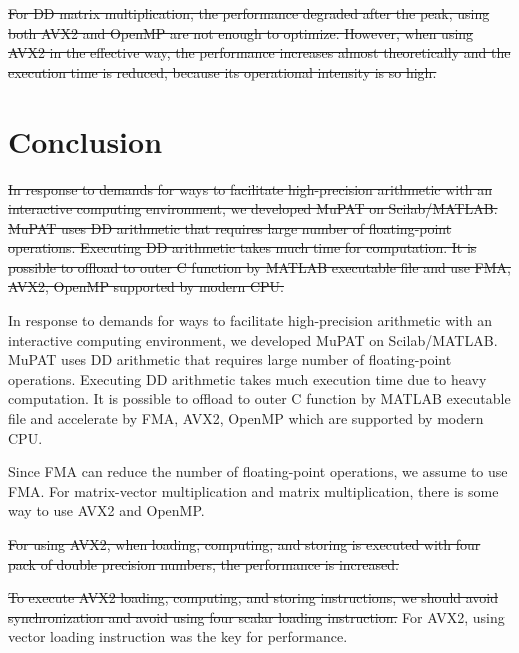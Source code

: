 \documentclass{IOS-Book-Article}
\begin{document}
\sout{For DD matrix multiplication, the performance degraded after the peak, using both AVX2 and OpenMP are not enough to optimize. However, when using AVX2 in the effective way, the performance increases almost theoretically and the execution time is reduced, because its operational intensity is so high.}

{\color{magenta}{For DD matrix multiplication, $j$-$k$-$i$ order of index, using AVX2 to load four continuous data, and using OpenMP to the outer loop is the best for MATLAB.
At that condition, the performance increases almost 16 times and the execution time is reduced, because its operational intensity is so high.}}

\section{Conclusion {\color{blue}{別紙で書き直す}}}
\sout{In response to demands for ways to facilitate high-precision arithmetic with an interactive computing environment, we developed MuPAT on Scilab/MATLAB. MuPAT uses DD arithmetic that requires large number of floating-point operations. Executing DD arithmetic takes much time for computation. It is possible to offload to outer C function by MATLAB executable file and use FMA, AVX2, OpenMP supported by modern CPU. }

In response to demands for ways to facilitate high-precision arithmetic with an interactive computing environment, 
we developed MuPAT on Scilab/MATLAB. MuPAT uses DD arithmetic that requires large number of floating-point operations. 
Executing DD arithmetic takes much execution time due to heavy computation.
It is possible to offload to outer C function by MATLAB executable file and accelerate by FMA, AVX2, OpenMP which are supported by modern CPU. 

Since FMA can reduce the number of floating-point operations, we assume to use FMA.  
For matrix-vector multiplication and matrix multiplication, there is some way to use AVX2 and OpenMP. 

\sout{For using AVX2, when loading, computing, and storing is executed with four pack of double precision numbers, the performance is increased. }

\sout{To execute AVX2 loading, computing, and storing instructions, we should avoid synchronization and avoid using four scalar loading instruction.}
For AVX2, using vector loading instruction was the key for performance. 
\end{document}
